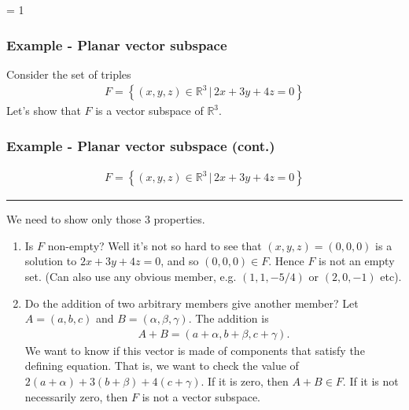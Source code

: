 \documentclass[usenames,dvipsnames,aspectratio=169,10pt]{beamer}
\def \EXAMPLEVERSION {1} %
\numberwithin{equation}{section}
\begin{document}
\ifnum \EXAMPLEVERSION = 1

\begin{frame}
\frametitle{Example - Planar vector subspace}
Consider the set of triples
\begin{align*}
F = \left\{ (x,y,z)\in\mathbb{R}^3 \, | \, 2x + 3y + 4z = 0 \right\}
\end{align*}
Let's show that $F$ is a vector subspace of $\mathbb{R}^3$.
\end{frame}



\begin{frame}
\frametitle{Example - Planar vector subspace (cont.)}
\vspace{-0.7cm}
\begin{align*}
F = \left\{ (x,y,z)\in\mathbb{R}^3 \, | \, 2x + 3y + 4z = 0 \right\}
\end{align*}

\vspace{-0.8cm}\begin{center} \textcolor{airforceblue}{\rule{0.7\textwidth}{0.3mm}} \end{center}\vspace{-0.2cm}

We need to show only those 3 properties.
\begin{enumerate}
\item Is $F$ non-empty? Well it's not so hard to see that $(x,y,z)=(0,0,0)$ is a solution to $2x + 3y + 4z = 0$, and so $(0,0,0)\in F$. Hence $F$ is not an empty set. (Can also use any obvious member, e.g. $(1,1,-5/4)$ or $(2,0,-1)$ etc).

\item Do the addition of two arbitrary members give another member? Let $A=(a,b,c)$ and $B=(\alpha,\beta,\gamma)$. The addition is
\begin{align*}
A+B = (a+\alpha, b+\beta, c+\gamma).
\end{align*}
We want to know if this vector is made of components that satisfy the defining equation. That is, we want to check the value of $2(a+\alpha) + 3(b+\beta) + 4(c+\gamma)$. If it is zero, then $A+B\in F$. If it is not necessarily zero, then $F$ is not a vector subspace.
\end{enumerate}
\end{frame}
\end{document}
